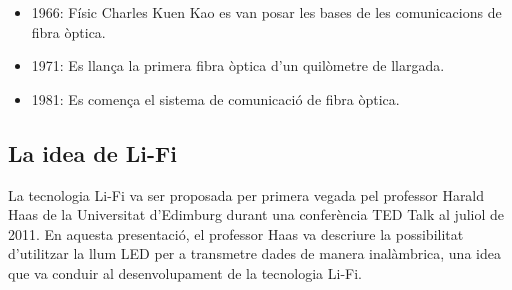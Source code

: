 \begin{itemize}
    \item 1966: Físic Charles Kuen Kao es van posar les bases de les comunicacions de fibra òptica.
    \item 1971: Es llança la primera fibra òptica d'un quilòmetre de llargada.
    \item 1981: Es comença el sistema de comunicació de fibra òptica.
\end{itemize}



\subsection*{La idea de Li-Fi}

La tecnologia Li-Fi va ser proposada per primera vegada pel professor Harald Haas de la Universitat d'Edimburg durant una conferència TED Talk al juliol de 2011. En aquesta presentació, el professor Haas va descriure la possibilitat d'utilitzar la llum LED per a transmetre dades de manera inalàmbrica, una idea que va conduir al desenvolupament de la tecnologia Li-Fi.



